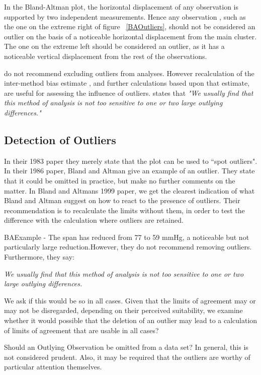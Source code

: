 \documentclass[12pt, a4paper]{report}
\theoremstyle{plain}
\theoremstyle{definition}
\theoremstyle{remark}
\begin{document}
In the Bland-Altman plot, the horizontal displacement of any observation is supported by two independent measurements. Hence any observation , such as the one on the extreme right of figure ~\ref{BAOutliers}, should not be considered an outlier on the basis of a noticeable horizontal displacement from the main cluster. The one	on the extreme left should be considered an outlier, as it has a
noticeable vertical displacement from the rest of the observations.
	
\citet*{BA99} do not recommend excluding outliers from analyses. However recalculation of the inter-method bias estimate , and further calculations based upon that estimate, are useful for assessing the influence of outliers.\citep{BA99} states that \emph{"We usually find that this method of analysis is not too sensitive to one or two large outlying differences."}


\subsection{Detection of Outliers}
In their 1983 paper they merely state that the plot can be used to
``spot outliers". In  their 1986 paper, Bland and Altman give an example of an
outlier. They state that it could be omitted in practice, but make
no further comments on the matter. In Bland and Altmans 1999 paper, we get the clearest indication of
what Bland and Altman suggest on how to react to the presence of
outliers. Their recommendation is to recalculate the limits
without them, in order to test the difference with the calculation
where outliers are retained.

BAExample -	The span has reduced from 77 to 59 mmHg, a noticeable but not
particularly large reduction.However, they do not recommend removing outliers. Furthermore, they say:

\textit{We usually find that this method of analysis is not too sensitive
	to one or two large outlying differences.}

We ask if this would be so in all cases. Given that the limits of
agreement may or may not be disregarded, depending on their
perceived suitability, we examine whether it would possible that
the deletion of an outlier may lead to a calculation of limits of
agreement that are usable in all cases?

Should an Outlying Observation be omitted from a data set? In
general, this is not considered prudent. Also, it may be required that the outliers are worthy of particular attention themselves.
\end{document}
